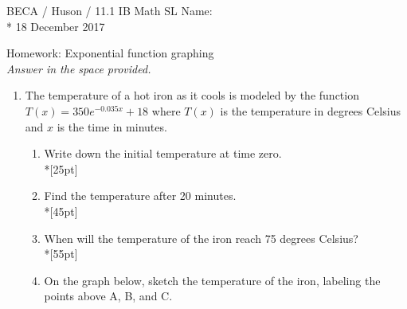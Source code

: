 \documentclass[]{book}
\begin{document}
\noindent BECA / Huson / 11.1 IB Math SL \hspace{2in} Name:\\*
18 December 2017
\begin{center}
{\Large Homework: Exponential function graphing}\\
\textit{Answer in the space provided.}
\end{center}



\begin{enumerate}
\item The temperature of a hot iron as it cools is modeled by the function $T(x)=350e^{-0.035x}+18$ where $T(x)$ is the temperature in degrees Celsius and $x$ is the time in minutes. 

\begin{enumerate}
    \item Write down the initial temperature at time zero.\\*[25pt]
    \item Find the temperature after 20 minutes.\\*[45pt]
    \item When will the temperature of the iron reach 75 degrees Celsius?\\*[55pt]
    \item On the graph below, sketch the temperature of the iron, labeling the points above A, B, and C.
\end{enumerate}

\begin{figure}[!htbp]
\begin{center}
\end{center}
\end{figure}
\end{enumerate}
\end{document}
